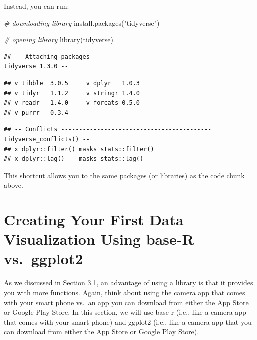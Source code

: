 \documentclass[
]{book}
\newenvironment{Shaded}{\begin{snugshade}}{\end{snugshade}}
\newcommand{\CommentTok}[1]{\textcolor[rgb]{0.56,0.35,0.01}{\textit{#1}}}
\newcommand{\FunctionTok}[1]{\textcolor[rgb]{0.00,0.00,0.00}{#1}}
\newcommand{\NormalTok}[1]{#1}
\newcommand{\StringTok}[1]{\textcolor[rgb]{0.31,0.60,0.02}{#1}}
\begin{document}
Instead, you can run:

\begin{Shaded}
\begin{Highlighting}[]
\CommentTok{\# downloading library}
\FunctionTok{install.packages}\NormalTok{(}\StringTok{"tidyverse"}\NormalTok{)}
\end{Highlighting}
\end{Shaded}

\begin{Shaded}
\begin{Highlighting}[]
\CommentTok{\# opening library}
\FunctionTok{library}\NormalTok{(tidyverse)}
\end{Highlighting}
\end{Shaded}

\begin{verbatim}
## -- Attaching packages --------------------------------------- tidyverse 1.3.0 --
\end{verbatim}

\begin{verbatim}
## v tibble  3.0.5     v dplyr   1.0.3
## v tidyr   1.1.2     v stringr 1.4.0
## v readr   1.4.0     v forcats 0.5.0
## v purrr   0.3.4
\end{verbatim}

\begin{verbatim}
## -- Conflicts ------------------------------------------ tidyverse_conflicts() --
## x dplyr::filter() masks stats::filter()
## x dplyr::lag()    masks stats::lag()
\end{verbatim}

This shortcut allows you to the same packages (or libraries) as the code chunk above.

\hypertarget{creating-your-first-data-visualization-using-base-r-vs.-ggplot2}{%
\section{Creating Your First Data Visualization Using base-R vs.~ggplot2}\label{creating-your-first-data-visualization-using-base-r-vs.-ggplot2}}

As we discussed in Section 3.1, an advantage of using a library is that it provides you with more functions. Again, think about using the camera app that comes with your smart phone vs.~an app you can download from either the App Store or Google Play Store. In this section, we will use base-r (i.e., like a camera app that comes with your smart phone) and ggplot2 (i.e., like a camera app that you can download from either the App Store or Google Play Store).
\end{document}
